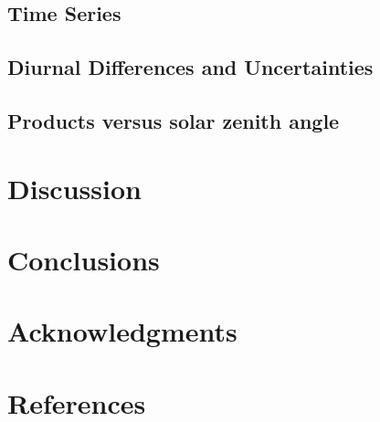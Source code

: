 \documentclass[onecolumn,3p,letterpaper,11pt]{elsarticle}
\begin{document}
\subsection{Time Series}

\subsection{Diurnal Differences and Uncertainties}

\subsection{Products versus solar zenith angle}


\section{Discussion}

\section{Conclusions}

\section*{Acknowledgments}
\vspace{-.2cm}

\section*{References}

\end{document}
